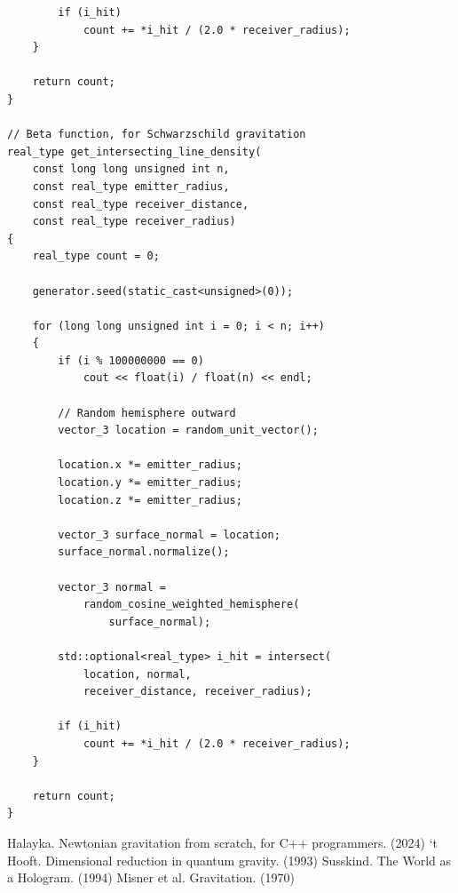 \documentclass[12pt]{article}
\begin{document}
\begin{lstlisting}
		if (i_hit)
			count += *i_hit / (2.0 * receiver_radius);
	}

	return count;
}

// Beta function, for Schwarzschild gravitation
real_type get_intersecting_line_density(
	const long long unsigned int n,
	const real_type emitter_radius,
	const real_type receiver_distance,
	const real_type receiver_radius)
{
	real_type count = 0;

	generator.seed(static_cast<unsigned>(0));

	for (long long unsigned int i = 0; i < n; i++)
	{
		if (i % 100000000 == 0)
			cout << float(i) / float(n) << endl;

		// Random hemisphere outward
		vector_3 location = random_unit_vector();

		location.x *= emitter_radius;
		location.y *= emitter_radius;
		location.z *= emitter_radius;

		vector_3 surface_normal = location;
		surface_normal.normalize();

		vector_3 normal = 
			random_cosine_weighted_hemisphere(
				surface_normal);

		std::optional<real_type> i_hit = intersect(
			location, normal, 
			receiver_distance, receiver_radius);

		if (i_hit)
			count += *i_hit / (2.0 * receiver_radius);
	}

	return count;
}
\end{lstlisting}















\begin{thebibliography}{9}


 Halayka. Newtonian gravitation from scratch, for C++ programmers. (2024)
 `t Hooft. Dimensional reduction in quantum gravity. (1993)
 Susskind. The World as a Hologram. (1994)
 Misner et al. Gravitation. (1970)

\end{thebibliography}


\pagebreak
\end{document}
